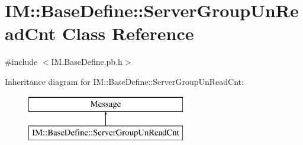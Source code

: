 \hypertarget{class_i_m_1_1_base_define_1_1_server_group_un_read_cnt}{}\section{I\+M\+:\+:Base\+Define\+:\+:Server\+Group\+Un\+Read\+Cnt Class Reference}
\label{class_i_m_1_1_base_define_1_1_server_group_un_read_cnt}


{\ttfamily \#include $<$I\+M.\+Base\+Define.\+pb.\+h$>$}

Inheritance diagram for I\+M\+:\+:Base\+Define\+:\+:Server\+Group\+Un\+Read\+Cnt\+:\begin{figure}[H]
\begin{center}
\leavevmode
\includegraphics[height=2.000000cm]{class_i_m_1_1_base_define_1_1_server_group_un_read_cnt}
\end{center}
\end{figure}
